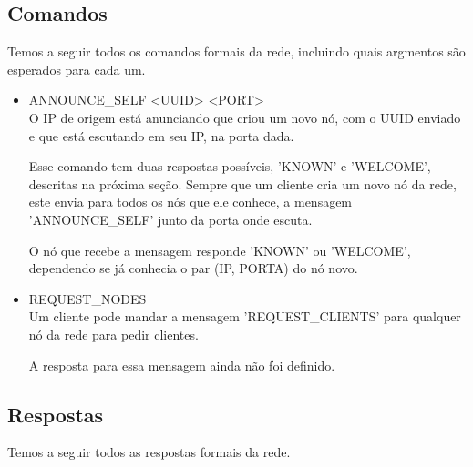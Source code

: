     \subsection{Comandos}
      Temos a seguir todos os comandos formais da rede, incluindo quais argmentos são esperados para cada um.
        
      \begin{itemize}
        \item ANNOUNCE\_SELF <UUID> <PORT> \\
          O IP de origem está anunciando que criou um novo nó, com o UUID enviado e que está escutando
          em seu IP, na porta dada.
          
          Esse comando tem duas respostas possíveis, 'KNOWN' e 'WELCOME', descritas na próxima seção.
            Sempre que um cliente cria um novo nó da rede, este envia para todos os nós que ele conhece, 
            a mensagem 'ANNOUNCE\_SELF' junto da porta onde escuta.
      
            O nó que recebe a mensagem responde 'KNOWN' ou 'WELCOME', dependendo se já conhecia o par
            (IP, PORTA) do nó novo.
      
        \item REQUEST\_NODES \\
          Um cliente pode mandar a mensagem 'REQUEST\_CLIENTS' para qualquer nó da rede para pedir clientes.
          
          A resposta para essa mensagem ainda não foi definido.
      \end{itemize}
      
    \subsection{Respostas}
      Temos a seguir todos as respostas formais da rede.
      

